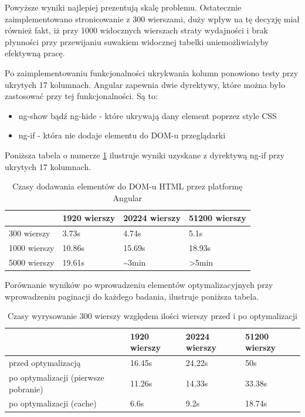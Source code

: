 \documentclass[a4paper,12pt,twoside]{article}
\begin{document}
Powyższe wyniki najlepiej prezentują skalę problemu. Ostatecznie zaimplementowano
stronicowanie z 300 wierszami, duży wpływ na tę decyzję miał również fakt, iż
przy 1000 widocznych wierszach straty wydajności i brak płynności przy przewijaniu
suwakiem widocznej tabelki uniemożliwiałyby efektywną pracę.

Po zaimplementowaniu funkcjonalności ukrykwania kolumn ponowiono testy przy ukrytych 17 kolumnach. Angular zapewnia dwie dyrektywy, które można było zastosować przy tej funkcjonalności. Są to:
\begin{itemize}
\item ng-show bądź ng-hide - które ukrywają dany element poprzez style CSS
\item ng-if - która nie dodaje elementu do DOM-u przeglądarki
\end{itemize}

Poniższa tabela o numerze \ref{table:tableRenderNgIf} ilustruje wyniki uzyskane z dyrektywą ng-if przy ukrytych 17 kolumnach.
\begin{table} [H]
\begin{tabular}{| p{3cm} | p{3cm} | p{3cm} | p{3cm}|}
\hline
& 1920 wierszy & 20224 wierszy & 51200 wierszy\\
\hline
300 wierszy& 3.73s& 4.74s& 5.1s\\ \hline
1000 wierszy& 10.86s & 15.69s& 18.93s\\ \hline
5000 wierszy& 19.61s& \textasciitilde 3min& >5min\\ \hline
\end{tabular}
\caption{Czasy dodawania elementów do DOM-u HTML przez platformę Angular}
\label{table:tableRenderNgIf}
\end{table}

Porównanie wyników po wprowadzeniu elementów optymalizacyjnych przy
wprowadzeniu paginacji do każdego badania, ilustruje poniższa
tabela.

\begin{table} [H]
\begin{tabular}{| p{3cm} | p{3cm} | p{3cm} | p{3cm}|}
\hline
& 1920 wierszy & 20224 wierszy & 51200 wierszy\\
\hline
przed optymalizacją& 16.45s& 24.22s& 50s\\ \hline
po optymalizacji (pierwsze pobranie)& 11.26s & 14.33s& 33.38s\\ \hline
po optymalizacji (cache)& 6.6s& 9.2s& 18.74s\\ \hline
\end{tabular}
\caption{Czasy wyrysowanie 300 wierszy względem ilości wierszy przed i po optymalizacji}
\label{table:summaryRender}
\end{table}
\end{document}
